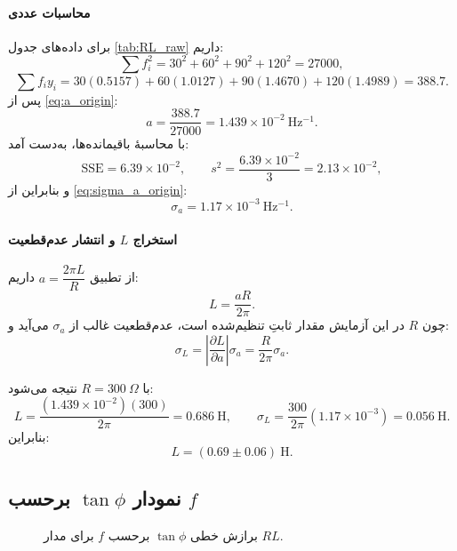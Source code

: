 \documentclass[a4paper, 11pt]{article}
\begin{document}
\paragraph{محاسبات عددی}
برای داده‌های جدول \ref{tab:RL_raw} داریم:
\[
\sum f_i^2=30^2+60^2+90^2+120^2=27000,
\]
\[
\sum f_i y_i = 30(0.5157)+60(1.0127)+90(1.4670)+120(1.4989)=388.7.
\]
پس از \eqref{eq:a_origin}:
\[
a = \frac{388.7}{27000}=1.439\times 10^{-2}\ \mathrm{Hz^{-1}}.
\]
با محاسبهٔ باقیمانده‌ها، به‌دست آمد:
\[
\mathrm{SSE}=6.39\times 10^{-2},\qquad
s^2=\frac{6.39\times 10^{-2}}{3}=2.13\times 10^{-2},
\]
و بنابراین از \eqref{eq:sigma_a_origin}:
\[
\sigma_a=1.17\times 10^{-3}\ \mathrm{Hz^{-1}}.
\]

\paragraph{استخراج $L$ و انتشار عدم‌قطعیت}
از تطبیق \(a=\dfrac{2\pi L}{R}\) داریم:
\begin{equation}
L=\frac{aR}{2\pi}.
\label{eq:L_from_a}
\end{equation}
چون \(R\) در این آزمایش مقدار ثابتِ تنظیم‌شده است، عدم‌قطعیت غالب از \(\sigma_a\) می‌آید و:
\begin{equation}
\sigma_L=\left|\frac{\partial L}{\partial a}\right|\sigma_a=\frac{R}{2\pi}\sigma_a.
\label{eq:sigma_L}
\end{equation}

با \(R=300~\Omega\) نتیجه می‌شود:
\[
L=\frac{(1.439\times10^{-2})(300)}{2\pi}=0.686\ \mathrm{H},
\qquad
\sigma_L=\frac{300}{2\pi}(1.17\times10^{-3})=0.056\ \mathrm{H}.
\]
بنابراین:
\[
\boxed{L=(0.69\pm 0.06)\ \mathrm{H}.}
\]

\subsection{نمودار \(\tan\phi\) برحسب \(f\)}

\begin{figure}[h!]
\centering
{}
\caption{برازش خطی \(\tan\phi\) برحسب \(f\) برای مدار $RL$.}
\label{fig:tan_f_RL}
\end{figure}
\end{document}

